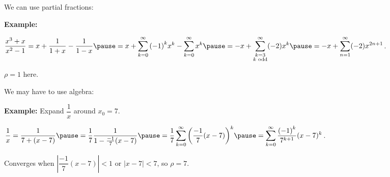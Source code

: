 \documentclass[10pt,aspectratio=169]{beamer}
\begin{document}
\begin{frame}
We can use partial fractions:

\pause
\medskip

\textbf{Example:}

\quad
$\displaystyle
\frac{x^3+x}{x^2-1}
=
x + \frac{1}{1+x} - \frac{1}{1-x}
\pause
=
x + \sum_{k=0}^\infty {(-1)}^k x^k - \sum_{k=0}^\infty x^k
\pause
=
- x + \sum_{\substack{k=3 \\ k \text{ odd}}}^\infty (-2) x^k
\pause
=
- x + \sum_{n=1}^\infty (-2) x^{2n+1}
$.

\pause
$\rho=1$ here.

\pause
\medskip

We may have to use algebra:

\pause
\medskip

\textbf{Example:}
Expand $\dfrac{1}{x}$ around $x_0 = 7$.

\pause
\medskip

\quad
$\displaystyle
\frac{1}{x}
=
\frac{1}{7 + (x-7)}
\pause
=
\frac{1}{7}
\frac{1}{1 - \frac{-1}{7}(x-7)}
\pause
=
\frac{1}{7}
\sum_{k=0}^\infty {\left(\frac{-1}{7}(x-7) \right)}^k
\pause
=
\sum_{k=0}^\infty \frac{{(-1)}^k}{7^{k+1}} (x-7)^k$.

\pause
\medskip

Converges when 
$\left\lvert \dfrac{-1}{7}(x-7) \right\rvert < 1$ or
$\lvert x-7 \rvert < 7$, so $\rho = 7$.


\end{frame}
\end{document}
